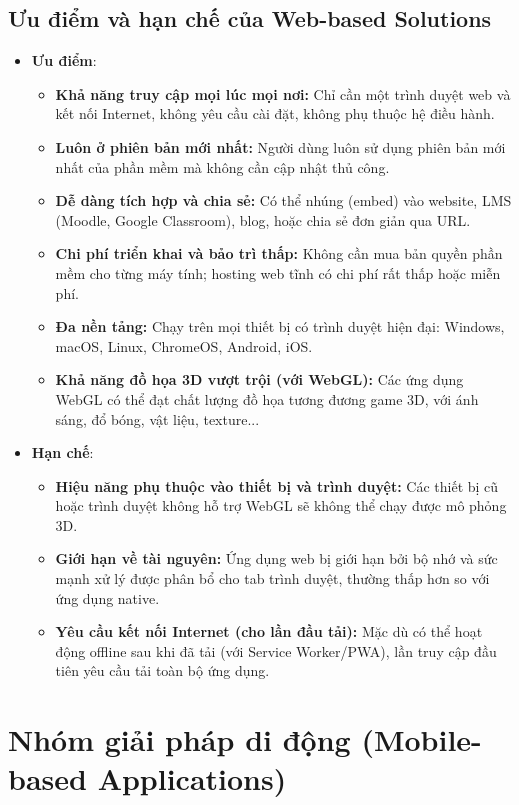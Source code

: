 \subsection{Ưu điểm và hạn chế của Web-based Solutions}

\begin{itemize}
    \item \textbf{Ưu điểm}:
    \begin{itemize}
        \item \textbf{Khả năng truy cập mọi lúc mọi nơi:} Chỉ cần một trình duyệt web và kết nối Internet, không yêu cầu cài đặt, không phụ thuộc hệ điều hành.
        \item \textbf{Luôn ở phiên bản mới nhất:} Người dùng luôn sử dụng phiên bản mới nhất của phần mềm mà không cần cập nhật thủ công.
        \item \textbf{Dễ dàng tích hợp và chia sẻ:} Có thể nhúng (embed) vào website, LMS (Moodle, Google Classroom), blog, hoặc chia sẻ đơn giản qua URL.
        \item \textbf{Chi phí triển khai và bảo trì thấp:} Không cần mua bản quyền phần mềm cho từng máy tính; hosting web tĩnh có chi phí rất thấp hoặc miễn phí.
        \item \textbf{Đa nền tảng:} Chạy trên mọi thiết bị có trình duyệt hiện đại: Windows, macOS, Linux, ChromeOS, Android, iOS.
        \item \textbf{Khả năng đồ họa 3D vượt trội (với WebGL):} Các ứng dụng WebGL có thể đạt chất lượng đồ họa tương đương game 3D, với ánh sáng, đổ bóng, vật liệu, texture...
    \end{itemize}
    \item \textbf{Hạn chế}:
    \begin{itemize}
        \item \textbf{Hiệu năng phụ thuộc vào thiết bị và trình duyệt:} Các thiết bị cũ hoặc trình duyệt không hỗ trợ WebGL sẽ không thể chạy được mô phỏng 3D.
        \item \textbf{Giới hạn về tài nguyên:} Ứng dụng web bị giới hạn bởi bộ nhớ và sức mạnh xử lý được phân bổ cho tab trình duyệt, thường thấp hơn so với ứng dụng native.
        \item \textbf{Yêu cầu kết nối Internet (cho lần đầu tải):} Mặc dù có thể hoạt động offline sau khi đã tải (với Service Worker/PWA), lần truy cập đầu tiên yêu cầu tải toàn bộ ứng dụng.
    \end{itemize}
\end{itemize}

\section{Nhóm giải pháp di động (Mobile-based Applications)}

